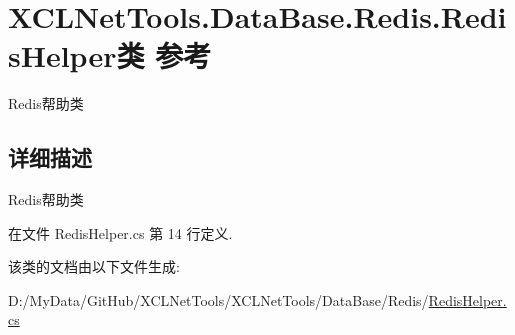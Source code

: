 \hypertarget{class_x_c_l_net_tools_1_1_data_base_1_1_redis_1_1_redis_helper}{}\section{X\+C\+L\+Net\+Tools.\+Data\+Base.\+Redis.\+Redis\+Helper类 参考}
\label{class_x_c_l_net_tools_1_1_data_base_1_1_redis_1_1_redis_helper}


Redis帮助类  




\subsection{详细描述}
Redis帮助类 



在文件 Redis\+Helper.\+cs 第 14 行定义.



该类的文档由以下文件生成\+:\begin{DoxyCompactItemize}
\item 
D\+:/\+My\+Data/\+Git\+Hub/\+X\+C\+L\+Net\+Tools/\+X\+C\+L\+Net\+Tools/\+Data\+Base/\+Redis/\hyperlink{_redis_helper_8cs}{Redis\+Helper.\+cs}\end{DoxyCompactItemize}

